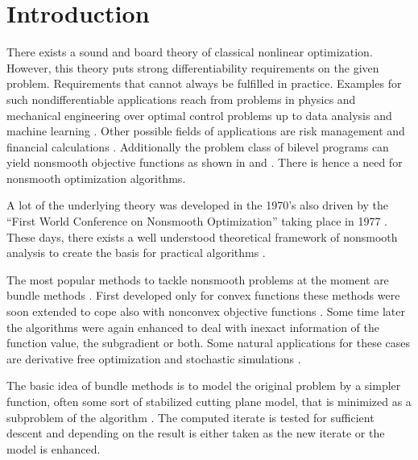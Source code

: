 \section{Introduction}

There exists a sound and board theory of classical nonlinear optimization. However, this theory puts strong differentiability requirements on the given problem. Requirements that cannot always be fulfilled in practice.
Examples for such nondifferentiable applications reach from problems in physics and mechanical engineering \cite{Clarke1990} over optimal control problems up to data analysis \cite{Bagirov2014} and machine learning \cite{Smola2007}.
Other possible fields of applications are risk management and financial calculations \cite{Nesterov2016,Teo2010}. 
Additionally the problem class of bilevel programs can yield nonsmooth objective functions as shown in \cite{Outrata1998} and \cite{Moore2011}.
There is hence a need for nonsmooth optimization algorithms.

A lot of the underlying theory was developed in the 1970's also driven by the ``First World Conference on Nonsmooth Optimization'' taking place in 1977 \cite{Mifflin2012}.
These days, there exists a well understood theoretical framework of nonsmooth analysis to create the basis for practical algorithms \cite{Rockafellar2009}.

The most popular methods to tackle nonsmooth problems at the moment are bundle methods \cite{Hare2016}. First developed only for convex functions \cite{Lemarechal1978} these methods were soon extended to cope also with nonconvex objective functions \cite{Mifflin1982}.
Some time later the algorithms were again enhanced to deal with inexact information of the function value, the subgradient or both.
Some natural applications for these cases are derivative free optimization and stochastic simulations \cite{Hare2016}.



The basic idea of bundle methods is to model the original problem by a simpler function, often some sort of stabilized cutting plane model, that is minimized as a subproblem of the algorithm \cite[chapter XV]{Hiriart-Urruty1993}. 
The computed iterate is tested for sufficient descent and depending on the result is either taken as the new iterate or the model is enhanced.

